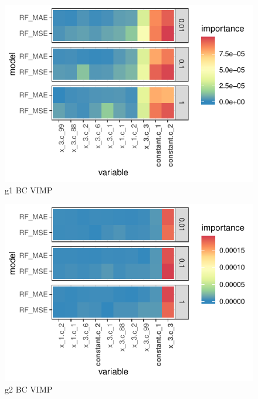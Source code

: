 \documentclass[11pt, a4paper, table]{article}
\begin{document}
\begin{figure}
	\includegraphics[]{../Results/simulation/graphics/simulation_g1_vimp_bc.pdf}
	\caption{g1 BC VIMP}
\end{figure}

\begin{figure}
	\includegraphics[]{../Results/simulation/graphics/simulation_g2_vimp_bc.pdf}
	\caption{g2 BC VIMP}
\end{figure}
\end{document}
